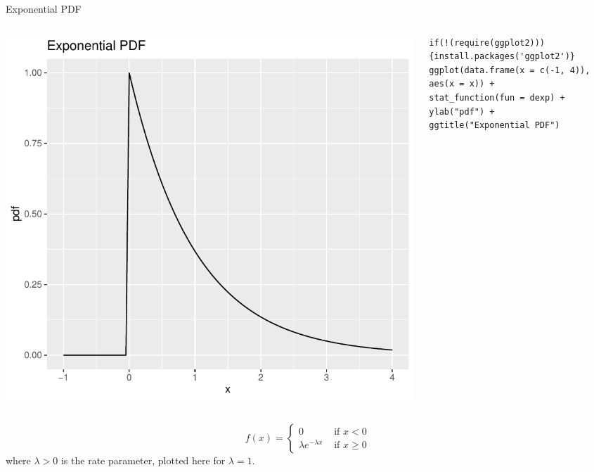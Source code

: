 \begin{frame}[fragile]{Exponential PDF}
\begin{columns}
\begin{column}{0.5\textwidth}
\begin{center}
\includegraphics[height=.5\textheight]{exp-pdf} 
\end{center}
\end{column}
\begin{column}{0.5\textwidth} 
\begin{lstlisting}
if(!(require(ggplot2))){install.packages('ggplot2')}
ggplot(data.frame(x = c(-1, 4)), aes(x = x)) +
stat_function(fun = dexp) +
ylab("pdf") +
ggtitle("Exponential PDF")
\end{lstlisting}
\end{column}
\end{columns}
\[
f\left(x\right) = \begin{cases}
	0 & \text{ if }x<0\\
	\lambda e^{- \lambda x} & \text{ if }x\ge 0
\end{cases}
\]
where $\lambda > 0$ is the rate parameter, plotted here for $\lambda=1$.
\end{frame}

